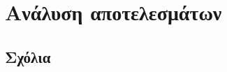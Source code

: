 \documentclass{report}
\begin{document}
\chapter{Ανάλυση αποτελεσμάτων}

\section{Σχόλια}


\nocite{*} %


\end{document}
